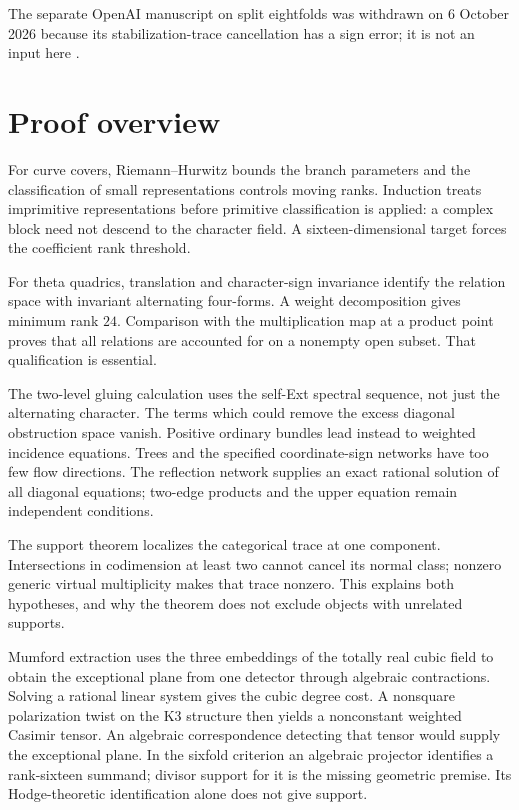 \documentclass[11pt]{article}
\theoremstyle{definition}
\theoremstyle{remark}
\begin{document}
The separate OpenAI manuscript on split eightfolds was withdrawn on
6 October 2026 because its stabilization-trace cancellation has a sign
error; it is not an input here \cite{OpenAIEightWithdrawn}.

\section{Proof overview}\label{sec:overview-b}
For curve covers, Riemann--Hurwitz bounds the branch parameters and
the classification of small representations controls moving ranks.
Induction treats imprimitive representations before primitive
classification is applied: a complex block need not descend to the
character field. A sixteen-dimensional target forces the coefficient
rank threshold.

For theta quadrics, translation and character-sign invariance identify
the relation space with invariant alternating four-forms. A weight
decomposition gives minimum rank $24$. Comparison with the
multiplication map at a product point proves that all relations are
accounted for on a nonempty open subset. That qualification is essential.

The two-level gluing calculation uses the self-Ext spectral sequence,
not just the alternating character. The terms which could remove the
excess diagonal obstruction space vanish. Positive ordinary bundles
lead instead to weighted incidence equations. Trees and the specified
coordinate-sign networks have too few flow directions. The reflection
network supplies an exact rational solution of all diagonal equations;
two-edge products and the upper equation remain independent conditions.

The support theorem localizes the categorical trace at one component.
Intersections in codimension at least two cannot cancel its normal
class; nonzero generic virtual multiplicity makes that trace nonzero.
This explains both hypotheses, and why the theorem does not exclude
objects with unrelated supports.

Mumford extraction uses the three embeddings of the totally real
cubic field to obtain the exceptional plane from one detector through
algebraic contractions. Solving a rational linear system gives the
cubic degree cost. A nonsquare polarization twist on the K3 structure
then yields a nonconstant weighted Casimir tensor. An algebraic
correspondence detecting that tensor would supply the exceptional
plane. In the sixfold criterion an algebraic projector identifies a
rank-sixteen summand; divisor support for it is the missing geometric
premise. Its Hodge-theoretic identification alone does not give support.
\end{document}
